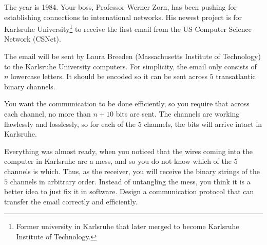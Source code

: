 

\newcommand{\maxn}{10\,000}
The year is 1984. Your boss, Professor Werner Zorn, has been pushing for establishing connections to international networks.
His newest project is for Karlsruhe University\footnote{Former university in Karlsruhe that later merged to become Karlsruhe Institute of Technology.}
to receive the first email from the US Computer Science Network (CSNet).

The email will be sent by Laura Breeden (Massachusetts Institute of Technology) to the Karlsruhe University computers.
For simplicity, the email only consists of $n$ lowercase letters. It should be encoded
so it can be sent across $5$ transatlantic binary channels.

You want the communication to be done efficiently, so you require that across each channel,
no more than $n+10$ bits are sent.
The channels are working flawlessly and losslessly, so for each of the $5$
channels, the bits will arrive intact in Karlsruhe.

Everything was almost ready, when you noticed that the wires coming into the
computer in Karlsruhe are a mess, and so you do not know which of the $5$ channels is which.
Thus, as the receiver, you will receive the binary strings of the $5$ channels in arbitrary order.
Instead of untangling the mess, you think it is a better idea to just fix it in software.
Design a communication protocol that can transfer the email correctly and efficiently.

